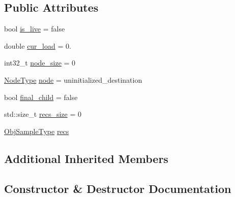 \subsection*{Public Attributes}
\begin{DoxyCompactItemize}
\item 
bool \hyperlink{structvt_1_1vrt_1_1collection_1_1lb_1_1_hier_l_b_child_a5f8a11f6cda4bfd18f869eb2f711f329}{is\+\_\+live} = false
\item 
double \hyperlink{structvt_1_1vrt_1_1collection_1_1lb_1_1_hier_l_b_child_a5dd23bde0bd84e45f15ee9f144f7fb9e}{cur\+\_\+load} = 0.
\item 
int32\+\_\+t \hyperlink{structvt_1_1vrt_1_1collection_1_1lb_1_1_hier_l_b_child_ac03c38a79a387b33024a98d788fc5afe}{node\+\_\+size} = 0
\item 
\hyperlink{namespacevt_a866da9d0efc19c0a1ce79e9e492f47e2}{Node\+Type} \hyperlink{structvt_1_1vrt_1_1collection_1_1lb_1_1_hier_l_b_child_a366bc483a75657b3dba66e0657c874fb}{node} = uninitialized\+\_\+destination
\item 
bool \hyperlink{structvt_1_1vrt_1_1collection_1_1lb_1_1_hier_l_b_child_adc83bddfb1fc46d47c4b3b2c0d75038a}{final\+\_\+child} = false
\item 
std\+::size\+\_\+t \hyperlink{structvt_1_1vrt_1_1collection_1_1lb_1_1_hier_l_b_child_a1e46ff60f1708faa33370015ed7466de}{recs\+\_\+size} = 0
\item 
\hyperlink{structvt_1_1vrt_1_1collection_1_1lb_1_1_hier_l_b_types_a597a60d517207b90e8c7984eac434e8f}{Obj\+Sample\+Type} \hyperlink{structvt_1_1vrt_1_1collection_1_1lb_1_1_hier_l_b_child_abd242f75213e90ed5cbf4add465c1e3c}{recs}
\end{DoxyCompactItemize}
\subsection*{Additional Inherited Members}


\subsection{Constructor \& Destructor Documentation}
\mbox{\label{structvt_1_1vrt_1_1collection_1_1lb_1_1_hier_l_b_child_a657aeb08f5f8e1779ecde563abec1059}} 
